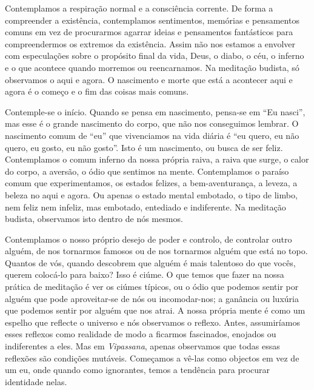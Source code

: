 Contemplamos a respiração normal e a consciência corrente. De forma a
compreender a existência, contemplamos sentimentos, memórias e pensamentos
comuns em vez de procurarmos agarrar ideias e pensamentos fantásticos para
compreendermos os extremos da existência. Assim não nos estamos a envolver com
especulações sobre o propósito final da vida, Deus, o diabo, o céu, o inferno e
o que acontece quando morremos ou reencarnamos. Na meditação budista, só
observamos o aqui e agora. O nascimento e morte que está a acontecer aqui e
agora é o começo e o fim das coisas mais comuns.

Contemple-se o início. Quando se pensa em nascimento, pensa-se em ``Eu nasci'',
mas esse é o grande nascimento do corpo, que não nos conseguimos lembrar. O
nascimento comum de ``eu'' que vivenciamos na vida diária é ``eu quero, eu não
quero, eu gosto, eu não gosto''. Isto é um nascimento, ou busca de ser feliz.
Contemplamos o comum inferno da nossa própria raiva, a raiva que surge, o calor
do corpo, a aversão, o ódio que sentimos na mente. Contemplamos o paraíso comum
que experimentamos, os estados felizes, a bem-aventurança, a leveza, a beleza no
aqui e agora. Ou apenas o estado mental embotado, o tipo de limbo, nem feliz nem
infeliz, mas embotado, entediado e indiferente. Na meditação budista, observamos
isto dentro de nós mesmos.

Contemplamos o nosso próprio desejo de poder e controlo, de controlar outro
alguém, de nos tornarmos famosos ou de nos tornarmos alguém que está no topo.
Quantos de vós, quando descobrem que alguém é mais talentoso do que vocês,
querem colocá-lo para baixo? Isso é ciúme. O que temos que fazer na nossa
prática de meditação é ver os ciúmes típicos, ou o ódio que podemos sentir por
alguém que pode aproveitar-se de nós ou incomodar-nos; a ganância ou luxúria que
podemos sentir por alguém que nos atrai. A nossa própria mente é como um espelho
que reflecte o universo e nós observamos o reflexo. Antes, assumiríamos esses
reflexos como realidade de modo a ficarmos fascinados, enojados ou indiferentes
a eles. Mas em \emph{Vipassana}, apenas observamos que todas essas reflexões são
condições mutáveis. %
Começamos a vê-las como objectos em vez de um eu, onde
quando como ignorantes, temos a tendência para procurar identidade nelas.

